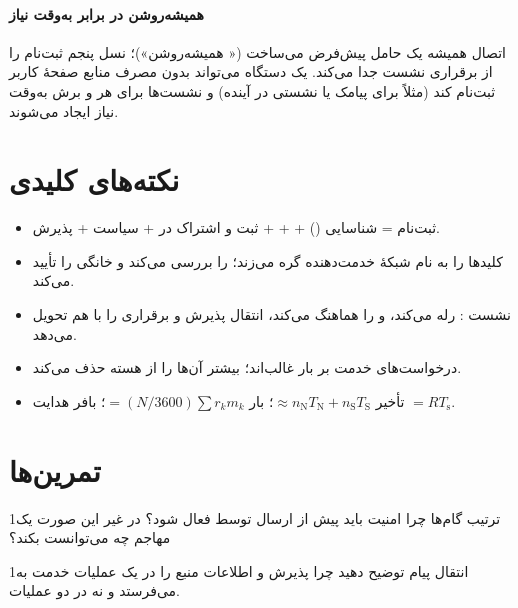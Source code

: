 \documentclass[11pt,a4paper]{article}
\begin{document}
\paragraph{همیشه‌روشن در برابر به‌وقت نیاز} اتصال  همیشه یک حامل پیش‌فرض می‌ساخت (« همیشه‌روشن»)؛ نسل پنجم ثبت‌نام
را از برقراری نشست جدا می‌کند. یک دستگاه می‌تواند بدون مصرف منابع صفحهٔ کاربر ثبت‌نام کند (مثلاً برای پیامک یا نشستی در آینده) و
نشست‌ها برای هر  و برش به‌وقت نیاز ایجاد می‌شوند.

\section{نکته‌های کلیدی}
\begin{takeawaybox}
\begin{itemize}
  \item ثبت‌نام = شناسایی () +  +  + ثبت و اشتراک در  + سیاست + پذیرش.
  \item {} کلیدها را به نام شبکهٔ خدمت‌دهنده گره می‌زند؛   را بررسی می‌کند و  خانگی
         را تأیید می‌کند.
  \item نشست :  رله می‌کند،   و  را هماهنگ می‌کند، انتقال  پذیرش 
        و برقراری  را با هم تحویل می‌دهد.
  \item درخواست‌های خدمت بر بار  غالب‌اند؛  بیشتر آن‌ها را از هسته حذف می‌کند.
  \item تأخیر $\approx n_{\mathrm{N}}T_{\mathrm{N}} + n_{\mathrm{S}}T_{\mathrm{S}}$؛ بار $= (N/3600)\sum r_k m_k$؛ بافر هدایت $= RT_{\mathrm{s}}$.
\end{itemize}
\end{takeawaybox}

\section{تمرین‌ها}

\begin{exercisebox}{1}{ترتیب گام‌ها}\label{exr:order}
چرا امنیت  باید پیش از ارسال  توسط  فعال شود؟ در غیر این صورت یک مهاجم چه می‌توانست
بکند؟
\end{exercisebox}

\begin{exercisebox}{1}{انتقال پیام }\label{exr:n1n2}
توضیح دهید چرا  پذیرش  و اطلاعات منبع  را در یک عملیات خدمت به  می‌فرستد و نه در دو عملیات.
\end{exercisebox}
\end{document}

